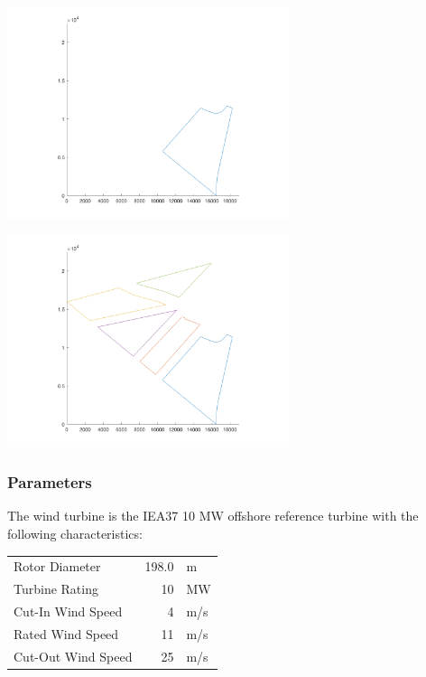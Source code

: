 \documentclass[10pt]{article}
\begin{document}
        \begin{minipage}[c]{0.49\textwidth}
            \centering
            \includegraphics[width=3.25in]{cs3-boundary.png}
            \label{fig:cs3-boundary}
        \end{minipage}\quad
        \begin{minipage}[c]{0.49\textwidth}
            \centering
            \includegraphics[width=3.25in]{cs4-boundary.png}
            \label{fig:cs4-boundary}
        \end{minipage}

    \subsubsection*{Parameters}

        The wind turbine is the IEA37 10 MW offshore reference turbine \cite{NREL10MW} with the following characteristics:
        \begin{center}
            \begin{tabular}{@{}lrl@{}}
            \toprule
                Rotor Diameter & 198.0 & m \\ 
                Turbine Rating & 10 & MW \\ 
                Cut-In Wind Speed & 4 & m/s \\ 
                Rated Wind Speed & 11 & m/s \\ 
                Cut-Out Wind Speed & 25 & m/s \\
            \bottomrule
            \end{tabular}
        \end{center}
\end{document}
